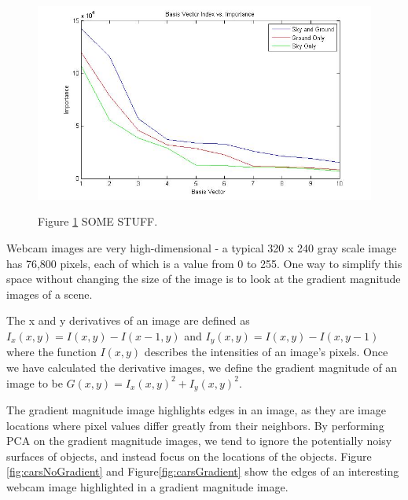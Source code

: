 \begin{figure}[ht]
	\centering
		\includegraphics[width=1\textwidth]{figures/skyMaskFig.jpg}
	\label{fig:skyMaskFig}
	
		\caption[Sky Mask stuff.]{Figure \ref{fig:skyMaskFig} SOME STUFF.}
\end{figure}


Webcam images are very high-dimensional - a typical 320 x 240 gray scale image has 76,800 pixels, each of
which is a value from 0 to 255.  One way to simplify this space without changing the size of the image is to look at the gradient magnitude images of a scene.  

The x and y derivatives of an image are defined as $I_x(x,y) = I(x,y)-I(x-1,y)$ and $I_y(x,y) = I(x,y)-I(x,y-1)$ where the function $I(x,y)$ describes the intensities of an image's pixels.  Once we have calculated the derivative images, we define the gradient magnitude of an image to be $G(x,y) = I_x(x,y)^2 + I_y(x,y)^2$.

The gradient magnitude image highlights edges in an image, as they are image locations where pixel values differ greatly from their neighbors.  By performing PCA on the gradient magnitude images, we tend to ignore the potentially noisy surfaces of objects, and instead focus on the locations of the objects.  Figure \ref{fig:carsNoGradient} and Figure\ref{fig:carsGradient} show the edges of an interesting webcam image highlighted in a gradient magnitude image.



